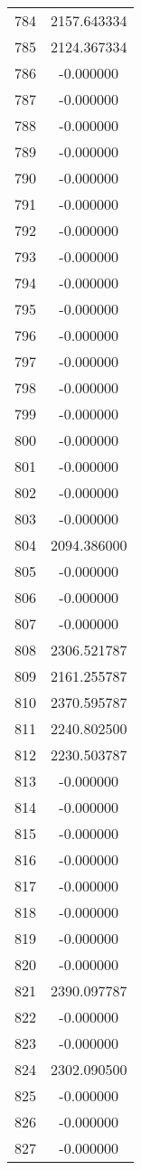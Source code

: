 \documentclass[12pt]{article}
\begin{document}
\begin{longtable}{@{}cc@{}}
784 & 2157.643334 \\
785 & 2124.367334 \\
786 & -0.000000 \\
787 & -0.000000 \\
788 & -0.000000 \\
789 & -0.000000 \\
790 & -0.000000 \\
791 & -0.000000 \\
792 & -0.000000 \\
793 & -0.000000 \\
794 & -0.000000 \\
795 & -0.000000 \\
796 & -0.000000 \\
797 & -0.000000 \\
798 & -0.000000 \\
799 & -0.000000 \\
800 & -0.000000 \\
801 & -0.000000 \\
802 & -0.000000 \\
803 & -0.000000 \\
804 & 2094.386000 \\
805 & -0.000000 \\
806 & -0.000000 \\
807 & -0.000000 \\
808 & 2306.521787 \\
809 & 2161.255787 \\
810 & 2370.595787 \\
811 & 2240.802500 \\
812 & 2230.503787 \\
813 & -0.000000 \\
814 & -0.000000 \\
815 & -0.000000 \\
816 & -0.000000 \\
817 & -0.000000 \\
818 & -0.000000 \\
819 & -0.000000 \\
820 & -0.000000 \\
821 & 2390.097787 \\
822 & -0.000000 \\
823 & -0.000000 \\
824 & 2302.090500 \\
825 & -0.000000 \\
826 & -0.000000 \\
827 & -0.000000 \\

\end{longtable}
\end{document}

